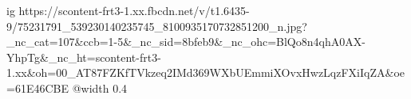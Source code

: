  
 
 
 
 

\ifcmt
  ig https://scontent-frt3-1.xx.fbcdn.net/v/t1.6435-9/75231791_539230140235745_8100935170732851200_n.jpg?_nc_cat=107&ccb=1-5&_nc_sid=8bfeb9&_nc_ohc=BlQo8n4qhA0AX-YhpTg&_nc_ht=scontent-frt3-1.xx&oh=00_AT87FZKfTVkzeq2IMd369WXbUEmmiXOvxHwzLqzFXiIqZA&oe=61E46CBE
  @width 0.4
\fi

